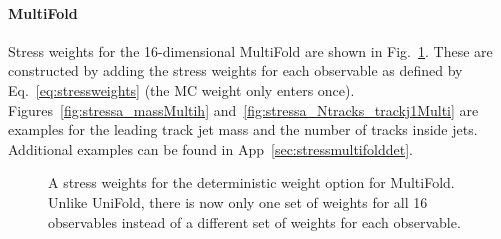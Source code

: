 \clearpage

\paragraph{MultiFold} Stress weights for the 16-dimensional MultiFold are shown in Fig.~\ref{fig:stressa_weightsMulti}.  These are constructed by adding the stress weights for each observable as defined by Eq.~\ref{eq:stressweights} (the MC weight only enters once).  Figures~\ref{fig:stressa_massMultih} and~\ref{fig:stressa_Ntracks_trackj1Multi} are examples for the leading track jet mass and the number of tracks inside jets.  Additional examples can be found in App~\ref{sec:stressmultifolddet}.

\begin{figure}[h!]
\centering
{}
\caption{A stress weights for the deterministic weight option for MultiFold.  Unlike UniFold, there is now only one set of weights for all 16 observables instead of a different set of weights for each observable.}
\label{fig:stressa_weightsMulti}
\end{figure}

